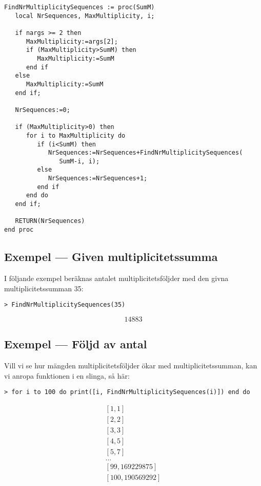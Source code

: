 \begin{verbatim}
FindNrMultiplicitySequences := proc(SumM)
   local NrSequences, MaxMultiplicity, i;

   if nargs >= 2 then
      MaxMultiplicity:=args[2];
      if (MaxMultiplicity>SumM) then
         MaxMultiplicity:=SumM
      end if
   else
      MaxMultiplicity:=SumM
   end if;

   NrSequences:=0;

   if (MaxMultiplicity>0) then
      for i to MaxMultiplicity do
         if (i<SumM) then
            NrSequences:=NrSequences+FindNrMultiplicitySequences(
               SumM-i, i);
         else
            NrSequences:=NrSequences+1;
         end if
      end do
   end if;

   RETURN(NrSequences)
end proc
\end{verbatim}

\subsection{Exempel --- Given multiplicitetssumma}

I följande exempel beräknas antalet multiplicitetsföljder med den givna multiplicitetssumman 35:

\begin{verbatim}
> FindNrMultiplicitySequences(35)
\end{verbatim}
\[14883\]

\subsection{Exempel --- Följd av antal}

Vill vi se hur mängden multiplicitetsföljder ökar med multiplicitetssumman, kan vi anropa funktionen i en slinga, så här:

\begin{verbatim}
> for i to 100 do print([i, FindNrMultiplicitySequences(i)]) end do
\end{verbatim}
\[
\begin{array}{c}
\left[1, 1\right]\\
\left[2, 2\right]\\
\left[3, 3\right]\\
\left[4, 5\right]\\
\left[5, 7\right]\\
\ldots\\
\left[99, 169229875\right]\\
\left[100, 190569292\right]\\
\end{array}
\]
